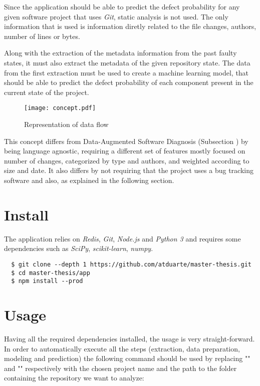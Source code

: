 Since the application should be able to predict the defect probability for any given software project that uses \emph{Git}, static analysis is not used. 
The only information that is used is information diretly related to the file changes, authors, number of lines or bytes.

Along with the extraction of the metadata information from the past faulty states, it must also extract the metadata of the given repository state. The data from the first extraction must be used to create a machine learning model, that should be able to predict the defect probability of each component present in the current state of the project.
%
\begin{figure}[ht]
  \begin{center}
    \leavevmode
    \texttt{[image: concept.pdf]}
    \caption{Representation of data flow}
    \label{fig:concept}
  \end{center}
\end{figure}

This concept differs from Data-Augmented Software Diagnosis (Subsection \label{subsec:elmishali}) by being language agnostic, requiring a different set of features mostly focused on number of changes, categorized by type and authors, and weighted according to size and date. It also differs by not requiring that the project uses a bug tracking software and also, as explained in the following section. 

\section{Install}

The application relies on \emph{Redis}, \emph{Git}, \emph{Node.js} and \emph{Python 3} and requires some dependencies such as \emph{SciPy}, \emph{scikit-learn}, \emph{numpy}.

\begin{lstlisting}
  $ git clone --depth 1 https://github.com/atduarte/master-thesis.git
  $ cd master-thesis/app
  $ npm install --prod
\end{lstlisting}

\section{Usage}

Having all the required dependencies installed, the usage is very straight-forward.
In order to automatically execute all the steps (extraction, data preparation, modeling and prediction) the following command should be used
by replacing "" and "" respectively with
the chosen project name and the path to the folder containing the repository we want to analyze:


